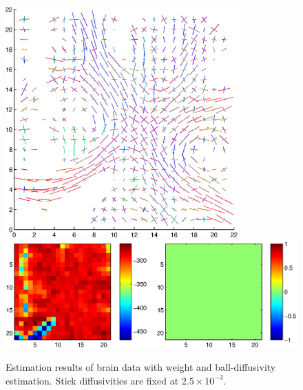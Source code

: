\documentclass{article}
\begin{document}
\begin{figure}[H]
  \caption{Estimation results of brain data with weight and ball-diffusivity estimation. Stick diffusivities are fixed at $2.5\times 10^{-3}$.}
  \centering
  \includegraphics[width=0.8\textwidth]{figures/brain_bas_weights_dir.eps}
  \includegraphics[width=\textwidth]{figures/brain_bas_weights_like.eps}
\end{figure}
\end{document}
